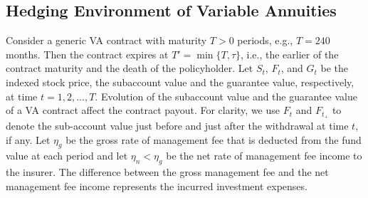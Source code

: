 \subsection{Hedging Environment of Variable Annuities} \label{subsec:VASimulation}

Consider a generic VA contract with maturity $T>0$ periods, e.g., $T=240$ months.
Then the contract expires at $T'=\min\{T,\tau\}$, i.e., the earlier of the contract maturity and the death of the policyholder.
Let $S_t$, $F_t$, and $G_t$ be the indexed stock price, the subaccount value and the guarantee value, respectively, at time $t=1,2,\ldots,T$.
Evolution of the subaccount value and the guarantee value of a VA contract affect the contract payout.
For clarity, we use $F_t$ and $F_{t_+}$ to denote the sub-account value just before and just after the withdrawal at time $t$, if any.
Let $\eta_g$ be the gross rate of management fee that is deducted from the fund value at each period and let $\eta_n < \eta_g$ be the net rate of management fee income to the insurer.
The difference between the gross management fee and the net management fee income represents the incurred investment expenses.

